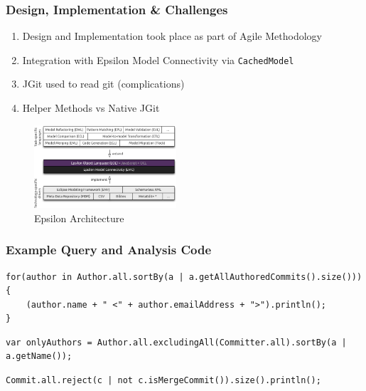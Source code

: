 \documentclass[aspectratio=1610]{beamer}
\newcommand{\code}[1]{\texttt{#1}}
\begin{document}
\begin{frame}
	\frametitle{Design, Implementation \& Challenges}
	\begin{enumerate}
		\item Design and Implementation took place as part of Agile Methodology
		\item Integration with Epsilon Model Connectivity via \code{CachedModel}
		\item JGit used to read git (complications)
		\item Helper Methods vs Native JGit
	\end{enumerate}
	\begin{figure}[H]
		\centering
		\includegraphics[width=200px]{images/epsilon-architecture}
		\caption{Epsilon Architecture}
	\end{figure}
\end{frame}

\begin{frame}[containsverbatim]
	\frametitle{Example Query and Analysis Code}
\begin{lstlisting}[caption=List authors by number of commits using EpsilonGit, label=lst:exampleCode]
for(author in Author.all.sortBy(a | a.getAllAuthoredCommits().size())) {
	(author.name + " <" + author.emailAddress + ">").println();
}	
	\end{lstlisting}

\begin{lstlisting}[caption=Find Authors who aren't committers, label=lst:exampleCode]
var onlyAuthors = Author.all.excludingAll(Committer.all).sortBy(a | a.getName());
\end{lstlisting}

\begin{lstlisting}[caption=Determine how many merges in repository, label=lst:exampleCode]
Commit.all.reject(c | not c.isMergeCommit()).size().println();
\end{lstlisting}
\end{frame}
\end{document}
